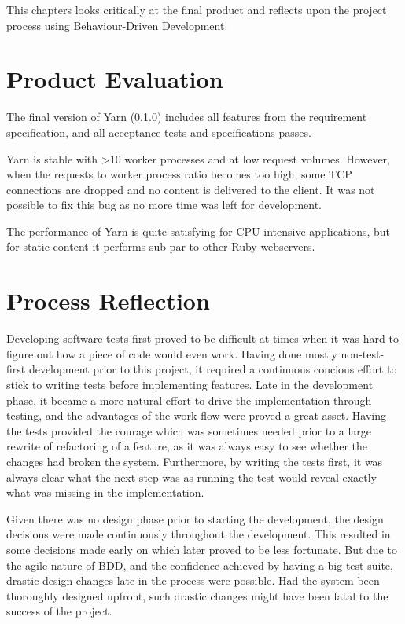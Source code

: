 This chapters looks critically at the final product and reflects upon the
project process using Behaviour-Driven Development.

\section{Product Evaluation}
The final version of Yarn (0.1.0) includes all features from the requirement
specification, and all acceptance tests and specifications passes. 

Yarn is stable with \textgreater 10 worker processes and at low request
volumes. However, when the requests to worker process ratio becomes too high,
some TCP connections are dropped and no content is delivered to the client.
It was not possible to fix this bug as no more time was left for
development.

The performance of Yarn is quite satisfying for CPU intensive applications,
but for static content it performs sub par to other Ruby webservers.

\section{Process Reflection}
Developing software tests first proved to be difficult at times when it was
hard to figure out how a piece of code would even work. Having done mostly
non-test-first development prior to this project, it required a continuous
concious effort to stick to writing tests before implementing features. Late
in the development phase, it became a more natural effort to drive the
implementation through testing, and the advantages of the work-flow were proved
a great asset. Having the tests provided the courage which was sometimes
needed prior to a large rewrite of refactoring of a feature, as it was always
easy to see whether the changes had broken the system. Furthermore, by writing
the tests first, it was always clear what the next step was as running the
test would reveal exactly what was missing in the implementation.

Given there was no design phase prior to starting the development, the design
decisions were made continuously throughout the development. This resulted in
some decisions made early on which later proved to be less fortunate. But due
to the agile nature of BDD, and the confidence achieved by having a big test
suite, drastic design changes late in the process were possible. Had the
system been thoroughly designed upfront, such drastic changes might have been
fatal to the success of the project.
